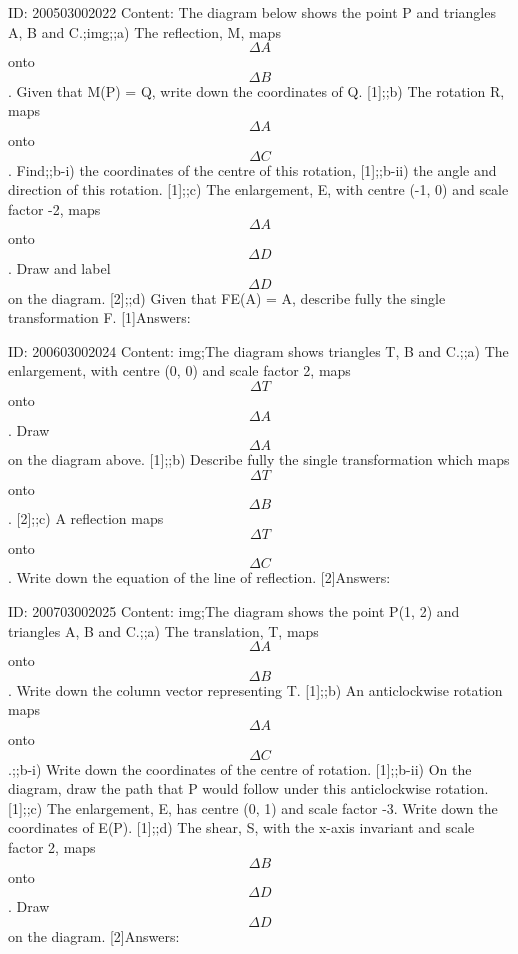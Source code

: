 \documentclass{article}
\begin{document}
ID: 200503002022
Content:
The diagram below shows the point P and triangles A, B and C.;img;;a) The reflection, M, maps $$\Delta  A$$ onto $$\Delta  B$$. Given that M(P) = Q, write down the coordinates of Q. [1];;b) The rotation R, maps $$\Delta  A$$  onto $$\Delta  C$$. Find;;b-i) the coordinates of the centre of this rotation, [1];;b-ii) the angle and direction of this rotation. [1];;c) The enlargement, E, with centre (-1, 0) and scale factor -2, maps $$\Delta  A$$  onto $$\Delta  D$$. Draw and label $$\Delta  D$$  on the diagram. [2];;d) Given that FE(A) = A, describe fully the single transformation F. [1]Answers:

ID: 200603002024
Content:
img;The diagram shows triangles T, B and C.;;a) The enlargement, with centre (0, 0) and scale factor 2, maps $$\Delta  T$$ onto $$\Delta  A$$. Draw $$\Delta  A$$ on the diagram above. [1];;b) Describe fully the single transformation which maps $$\Delta  T $$ onto $$\Delta  B$$. [2];;c) A reflection maps $$\Delta  T$$ onto $$\Delta  C$$. Write down the equation of the line of reflection. [2]Answers:

ID: 200703002025
Content:
img;The diagram shows the point P(1, 2) and triangles A, B and C.;;a) The translation, T, maps $$\Delta  A$$ onto $$\Delta  B$$. Write down the column vector representing T. [1];;b) An anticlockwise rotation maps $$\Delta  A$$ onto $$\Delta  C$$.;;b-i) Write down the coordinates of the centre of rotation. [1];;b-ii) On the diagram, draw the path that P would follow under this anticlockwise rotation. [1];;c) The enlargement, E, has centre (0, 1) and scale factor -3. Write down the coordinates of E(P). [1];;d) The shear, S, with the x-axis invariant and scale factor 2, maps $$\Delta  B$$ onto $$\Delta  D$$. Draw $$\Delta  D$$ on the diagram. [2]Answers:
\end{document}
